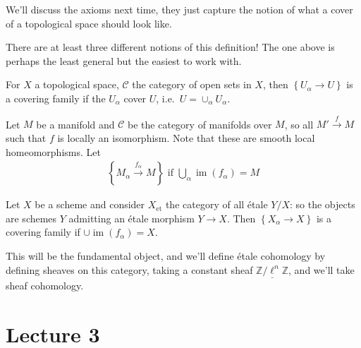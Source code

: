 We'll discuss the axioms next time, they just capture the notion of what
a cover of a topological space should look like.

\begin{warnings}

There are at least three different notions of this definition! The one
above is perhaps the least general but the easiest to work with.

\end{warnings}

\begin{example}[?]

For \(X\) a topological space, \(\mathcal{C}\) the category of open sets
in \(X\), then \(\left\{{U_\alpha\to U}\right\}\) is a covering family
if the \(U_\alpha\) cover \(U\), i.e.~\(U = \cup_\alpha U_\alpha\).

\end{example}

\begin{example}

Let \(M\) be a manifold and \(\mathcal{C}\) be the category of manifolds
over \(M\), so all \(M' \xrightarrow{f} M\) such that \(f\) is locally
an isomorphism. Note that these are smooth local homeomorphisms. Let
\begin{align*}
\left\{{M_\alpha \xrightarrow{f_\alpha} M}\right\} \text{ if } \bigcup_\alpha \operatorname{im}(f_\alpha) = M
\end{align*}

\end{example}

\begin{example}

Let \(X\) be a scheme and consider \(X_{\text{et}}\) the category of all
étale \(Y/X\): so the objects are schemes \(Y\) admitting an étale
morphism \(Y\to X\). Then \(\left\{{X_\alpha\to X}\right\}\) is a
covering family if \(\cup\operatorname{im}(f_\alpha) = X\).

\end{example}

This will be the fundamental object, and we'll define étale cohomology
by defining sheaves on this category, taking a constant sheaf
\(\underline{{\mathbb{Z}}/\ell^n{\mathbb{Z}}}\), and we'll take sheaf
cohomology.

\hypertarget{lecture-3}{%
\section{Lecture 3}\label{lecture-3}}

